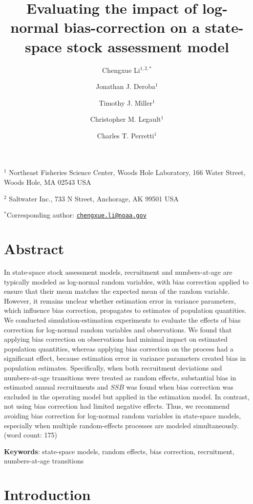 \documentclass[
  12pt,
]{article}
\title{Evaluating the impact of log-normal bias-correction on a
state-space stock assessment model}
\author{Chengxue Li\(^{1,2,*}\) \and Jonathan J.
Deroba\(^1\) \and Timothy J. Miller\(^1\) \and Christopher M.
Legault\(^1\) \and Charles T. Perretti\(^1\)}
\date{}
\begin{document}
\maketitle

\(^1\) Northeast Fisheries Science Center, Woods Hole Laboratory, 166
Water Street, Woods Hole, MA 02543 USA

\(^2\) Saltwater Inc., 733 N Street, Anchorage, AK 99501 USA

\(^*\)Corresponding author:
\href{mailto:chengxue.li@noaa.gov}{\nolinkurl{chengxue.li@noaa.gov}}

\pagebreak

\hypertarget{abstract}{%
\section*{Abstract}\label{abstract}}

In state-space stock assessment models, recruitment and numbers-at-age
are typically modeled as log-normal random variables, with bias
correction applied to ensure that their mean matches the expected mean
of the random variable. However, it remains unclear whether estimation
error in variance parameters, which influence bias correction,
propagates to estimates of population quantities. We conducted
simulation-estimation experiments to evaluate the effects of bias
correction for log-normal random variables and observations. We found
that applying bias correction on observations had minimal impact on
estimated population quantities, whereas applying bias correction on the
process had a significant effect, because estimation error in variance
parameters created bias in population estimates. Specifically, when both
recruitment deviations and numbers-at-age transitions were treated as
random effects, substantial bias in estimated annual recruitments and
\(SSB\) was found when bias correction was excluded in the operating
model but applied in the estimation model. In contrast, not using bias
correction had limited negative effects. Thus, we recommend avoiding
bias correction for log-normal random variables in state-space models,
especially when multiple random-effects processes are modeled
simultaneously. (word count: 175)

\textbf{Keywords}: state-space models, random effects, bias correction,
recruitment, numbers-at-age transitions

\pagebreak

\hypertarget{introduction}{%
\section{Introduction}\label{introduction}}
\end{document}
